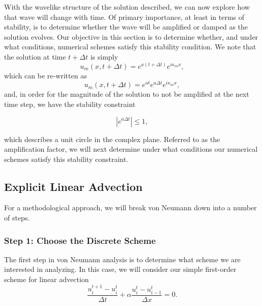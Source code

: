 With the wavelike structure of the solution described, we can now explore how that wave will change with time. Of primary importance, at least in terms of stability, is to determine whether the wave will be amplified or damped as the solution evolves. Our objective in this section is to determine whether, and under what conditions, numerical schemes satisfy this stability condition. We note that the solution at time $t+\Delta t$ is simply
\begin{equation}
	u_m(x,t+\Delta t) = e^{a(t+\Delta t)} e^{i \kappa_m x},
\end{equation}
which can be re-written as
\begin{equation}
	u_m(x,t+\Delta t) = e^{at}e^{a\Delta t} e^{i \kappa_m x},
\end{equation}
and, in order for the magnitude of the solution to not be amplified at the next time step, we have the stability constraint
\begin{eqBox}
\begin{equation}
	|e^{a\Delta t}| \leq 1,
\end{equation}
\end{eqBox}
which describes a unit circle in the complex plane. Referred to as the amplification factor, we will next determine under what conditions our numerical schemes satisfy this stability constraint.

\subsection{Explicit Linear Advection}
For a methodological approach, we will break von Neumann down into a number of steps.

\subsubsection{Step 1: Choose the Discrete Scheme}
The first step in von Neumann analysis is to determine what scheme we are interested in analyzing. In this case, we will consider our simple first-order scheme for linear advection
\begin{equation}
	\frac{u_i^{t+1} - u_{i}^t}{\Delta t} +  \alpha \frac{u_i^t - u_{i-1}^t}{\Delta x} = 0.
\end{equation}

